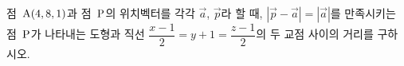 점~$\mathrm{A}(4{,}\mkern3mu\mathopen{}8{,}\mkern3mu\mathopen{}1)$과 점~$\mathrm{P}$의 위치벡터를 각각 $\vec{a}$, $\vec{p}$라 할 때, $|\vec{p}-\vec{a}|=|\vec{a}|$를 만족시키는 점~$\mathrm{P}$가 나타내는 도형과 직선 $\dfrac{x-1}{2}=y+1=\dfrac{z-1}{2}$의 두 교점 사이의 거리를 구하시오.
